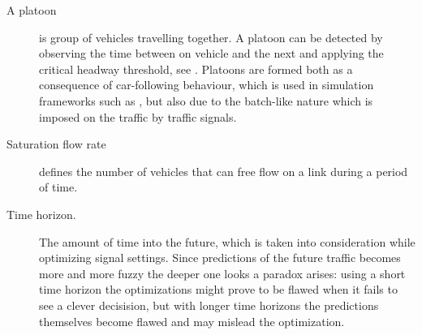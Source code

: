 \begin{description}
	\item[A platoon] is group of vehicles travelling together. A platoon can be detected by observing the time between on vehicle and the next and applying the critical headway threshold, see \cite[sct. 2]{25}. 
Platoons are formed both as a consequence of car-following behaviour, which is used in simulation frameworks such as \cite{treiber-2000-62}, but also due to the batch-like nature which is imposed on the traffic by traffic signals.

\item[Saturation flow rate] defines the number of vehicles that can free flow on a link during a period of time.

\item[Time horizon.] The amount of time into the future, which is taken into consideration while optimizing signal settings. Since predictions of the future traffic becomes more and more fuzzy the deeper one looks a paradox arises: using a short time horizon the optimizations might prove to be flawed when it fails to see a clever decisision, but with longer time horizons the predictions themselves become flawed and may mislead the optimization.

\end{description}
